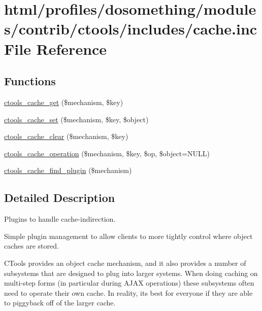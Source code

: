 \hypertarget{profiles_2dosomething_2modules_2contrib_2ctools_2includes_2cache_8inc}{
\section{html/profiles/dosomething/modules/contrib/ctools/includes/cache.inc File Reference}
\label{profiles_2dosomething_2modules_2contrib_2ctools_2includes_2cache_8inc}
}
\subsection*{Functions}
\begin{DoxyCompactItemize}
\item 
\hyperlink{profiles_2dosomething_2modules_2contrib_2ctools_2includes_2cache_8inc_aecf3d4869c6b8eabd5d9be3dfd6d08b2}{ctools\_\-cache\_\-get} (\$mechanism, \$key)
\item 
\hyperlink{profiles_2dosomething_2modules_2contrib_2ctools_2includes_2cache_8inc_a631e9d4813f723aa49a49aa85f8c4c8c}{ctools\_\-cache\_\-set} (\$mechanism, \$key, \$object)
\item 
\hyperlink{profiles_2dosomething_2modules_2contrib_2ctools_2includes_2cache_8inc_a101263b0d8cf633a221db17bff52e47b}{ctools\_\-cache\_\-clear} (\$mechanism, \$key)
\item 
\hyperlink{profiles_2dosomething_2modules_2contrib_2ctools_2includes_2cache_8inc_aaa68caf3223df01f8a019a10a7f5cbd9}{ctools\_\-cache\_\-operation} (\$mechanism, \$key, \$op, \$object=NULL)
\item 
\hyperlink{profiles_2dosomething_2modules_2contrib_2ctools_2includes_2cache_8inc_ae2a3a4be93449ac5ed9c98c3b40f9004}{ctools\_\-cache\_\-find\_\-plugin} (\$mechanism)
\end{DoxyCompactItemize}


\subsection{Detailed Description}
Plugins to handle cache-\/indirection.

Simple plugin management to allow clients to more tightly control where object caches are stored.

CTools provides an object cache mechanism, and it also provides a number of subsystems that are designed to plug into larger systems. When doing caching on multi-\/step forms (in particular during AJAX operations) these subsystems often need to operate their own cache. In reality, its best for everyone if they are able to piggyback off of the larger cache.

